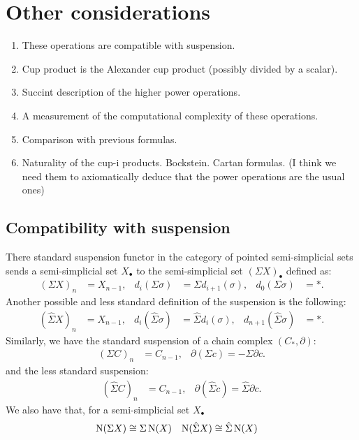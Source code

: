 
\section{Other considerations}

\begin{enumerate}
	\item These operations are compatible with suspension.
	\item Cup product is the Alexander cup product (possibly divided by a scalar).
	\item Succint description of the higher power operations.
	\item A measurement of the computational complexity of these operations.
	\item Comparison with previous formulas.
	\item Naturality of the cup-i products. Bockstein. Cartan formulas. (I think we need them to axiomatically deduce that the power operations are the usual ones)
\end{enumerate}
\subsection{Compatibility with suspension} There standard suspension functor in the category of pointed semi-simplicial sets sends a semi-simplicial set $X_\bullet$ to the semi-simplicial set $(\Sigma X)_\bullet$ defined as:
\begin{align*}
    (\Sigma X)_n &= X_{n-1},& d_i(\Sigma\sigma) &= \Sigma d_{i+1}(\sigma),& d_{0}(\Sigma \sigma) &= *.
\end{align*}
Another possible and less standard definition of the suspension is the following:
\begin{align*}
    (\hat{\Sigma} X)_n &= X_{n-1}, &d_i(\hat{\Sigma}\sigma) &= \hat{\Sigma} d_i(\sigma),& d_{n+1}(\hat{\Sigma} \sigma) &= *.
\end{align*}
Similarly, we have the standard suspension of a chain complex $(C_*,\partial)$:
\begin{align*}
    (\Sigma C)_n &= C_{n-1}, & \partial (\Sigma c) = -\Sigma \partial c.
\end{align*}
and the less standard suspension:
\begin{align*}
    (\hat{\Sigma} C)_n &= C_{n-1}, & \partial (\hat{\Sigma} c) = \hat{\Sigma} \partial c.
\end{align*}
We also have that, for a semi-simplicial set $X_\bullet$ \begin{align*}
    \operatorname{N}(\Sigma X)&\cong \Sigma \operatorname{N}(X) & \operatorname{N}(\hat{\Sigma}X) &\cong \hat{\Sigma}\operatorname{N}(X)
\end{align*}


